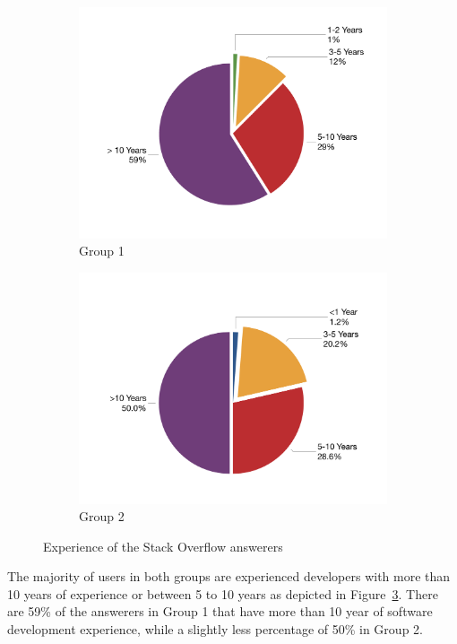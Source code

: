 \documentclass{svjour3}                     %
\begin{document}
\begin{figure}
	\begin{subfigure}{.5\textwidth}
		\centering
		\includegraphics[width=0.8\linewidth]{survey_exp_1}
		\caption{Group 1}
		\label{fig:survey_group1_exp}
	\end{subfigure}%
	\begin{subfigure}{.5\textwidth}
		\centering
		\includegraphics[width=0.8\linewidth]{survey_exp_2}
		\caption{Group 2}
		\label{fig:survey_group2_exp}
	\end{subfigure}
	\caption{Experience of the Stack Overflow answerers}
	\label{fig:survey_exp}
\end{figure}

The majority of users in both groups are experienced developers 
with more than 10 years of experience or between 5 to 10 years 
as depicted in Figure~\ref{fig:survey_exp}. There are 59\% of the answerers in Group 1 that have more than 10 year of software development experience, while a slightly less percentage of 50\% in Group 2.
\end{document}
